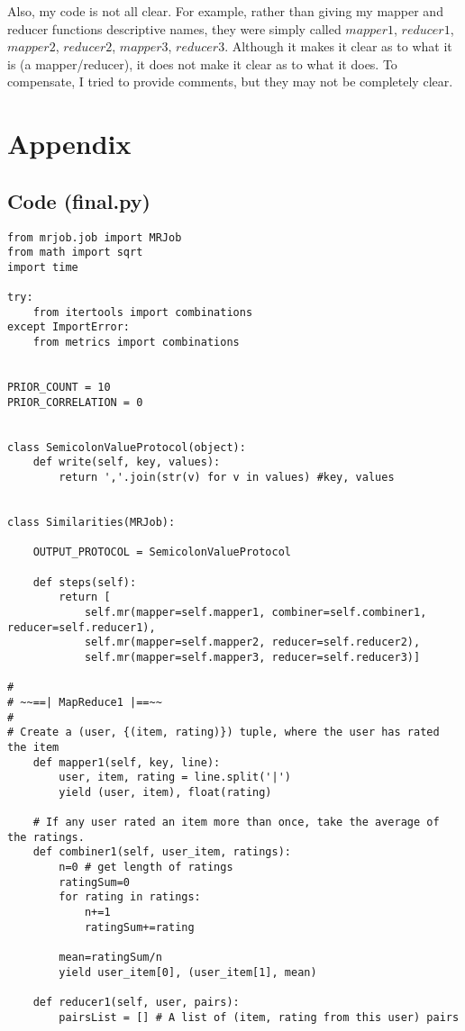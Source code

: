 \documentclass{article}
\begin{document}
Also, my code is not all clear. For example, rather than giving my mapper and reducer functions descriptive names, they were simply called $mapper1$, $reducer1$, $mapper2$, $reducer2$, $mapper3$, $reducer3$. Although it makes it clear as to what it is (a mapper/reducer), it does not make it clear as to what it does. To compensate, I tried to provide comments, but they may not be completely clear.

\section{Appendix}

\subsection{Code (final.py)}
\begin{verbatim}
from mrjob.job import MRJob
from math import sqrt
import time

try:
    from itertools import combinations
except ImportError:
    from metrics import combinations


PRIOR_COUNT = 10
PRIOR_CORRELATION = 0


class SemicolonValueProtocol(object):
    def write(self, key, values):
        return ','.join(str(v) for v in values) #key, values


class Similarities(MRJob):

    OUTPUT_PROTOCOL = SemicolonValueProtocol

    def steps(self):
        return [
            self.mr(mapper=self.mapper1, combiner=self.combiner1, reducer=self.reducer1),
            self.mr(mapper=self.mapper2, reducer=self.reducer2),
            self.mr(mapper=self.mapper3, reducer=self.reducer3)]

#
# ~~==| MapReduce1 |==~~
#
# Create a (user, {(item, rating)}) tuple, where the user has rated the item
    def mapper1(self, key, line):
        user, item, rating = line.split('|')
        yield (user, item), float(rating)

    # If any user rated an item more than once, take the average of the ratings.
    def combiner1(self, user_item, ratings):
        n=0 # get length of ratings
        ratingSum=0
        for rating in ratings:
            n+=1
            ratingSum+=rating

        mean=ratingSum/n
        yield user_item[0], (user_item[1], mean)

    def reducer1(self, user, pairs):
        pairsList = [] # A list of (item, rating from this user) pairs


\end{verbatim}
\end{document}
